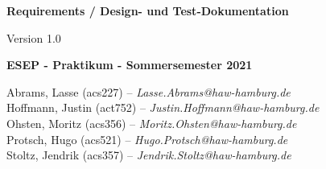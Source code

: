 \begin{titlepage}
    \begin{center}
        \begin{huge}
            \textbf{Requirements / Design- und Test-Dokumentation}
        \end{huge}

        \begin{large}
            \vspace{0.5cm}
            Version 1.0

            \vspace{0.5cm}

            \textbf{ESEP - Praktikum - Sommersemester 2021}
        \end{large}

        \vspace{0.5cm}

        \vfill

        Abrams, Lasse (acs227) -- \textit{Lasse.Abrams@haw-hamburg.de}\\
        Hoffmann, Justin (act752) -- \textit{Justin.Hoffmann@haw-hamburg.de}\\
        Ohsten, Moritz (acs356) -- \textit{Moritz.Ohsten@haw-hamburg.de}\\
        Protsch, Hugo (acs521) -- \textit{Hugo.Protsch@haw-hamburg.de}\\
        Stoltz, Jendrik (acs357) -- \textit{Jendrik.Stoltz@haw-hamburg.de}\\
    \end{center}
\end{titlepage}
